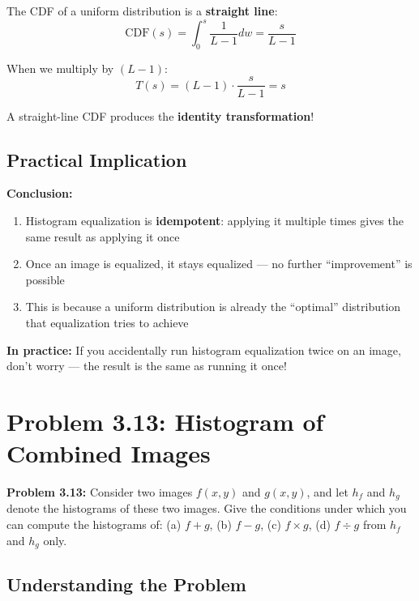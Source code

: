 \documentclass[12pt,a4paper]{article}
\begin{document}
\begin{conceptbox}
The CDF of a uniform distribution is a \textbf{straight line}:
\[
\text{CDF}(s) = \int_0^s \frac{1}{L-1} dw = \frac{s}{L-1}
\]

When we multiply by $(L-1)$:
\[
T(s) = (L-1) \cdot \frac{s}{L-1} = s
\]

A straight-line CDF produces the \textbf{identity transformation}!
\end{conceptbox}

\subsection{Practical Implication}

\begin{keypoint}
\textbf{Conclusion:}
\begin{enumerate}
    \item Histogram equalization is \textbf{idempotent}: applying it multiple times gives the same result as applying it once
    \item Once an image is equalized, it stays equalized --- no further ``improvement'' is possible
    \item This is because a uniform distribution is already the ``optimal'' distribution that equalization tries to achieve
\end{enumerate}

\textbf{In practice:} If you accidentally run histogram equalization twice on an image, don't worry --- the result is the same as running it once!
\end{keypoint}

\newpage
\section{Problem 3.13: Histogram of Combined Images}

\begin{questionbox}
\textbf{Problem 3.13:} Consider two images $f(x,y)$ and $g(x,y)$, and let $h_f$ and $h_g$ denote the histograms of these two images. Give the conditions under which you can compute the histograms of:
(a) $f+g$, (b) $f-g$, (c) $f \times g$, (d) $f \div g$ from $h_f$ and $h_g$ only.
\end{questionbox}

\subsection{Understanding the Problem}
\end{document}
